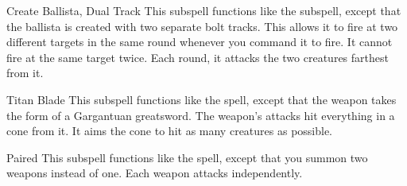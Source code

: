 \begin{ability}[\nth{6}]{Create Ballista, Dual Track}
This subspell functions like the  subspell, except that the ballista is created with two separate bolt tracks.
This allows it to fire at two different targets in the same round whenever you command it to fire.
It cannot fire at the same target twice.
Each round, it attacks the two creatures farthest from it.
\end{ability}
\vspace{0.25em}


\begin{ability}[\nth{8}]{Titan Blade}
This subspell functions like the  spell, except that the weapon takes the form of a Gargantuan greatsword.
The weapon's attacks hit everything in a \areamed cone from it.
It aims the cone to hit as many creatures as possible.
\end{ability}
\vspace{0.25em}


\begin{ability}[\nth{9}]{Paired}
This subspell functions like the  spell, except that you summon two weapons instead of one.
Each weapon attacks independently.
\end{ability}
\vspace{0.25em}
